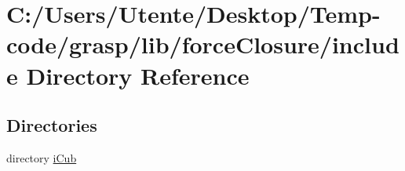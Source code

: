 \section{C\+:/\+Users/\+Utente/\+Desktop/\+Temp-\/code/grasp/lib/force\+Closure/include Directory Reference}
\label{dir_2755f29db1d4c659bd67ec84dbccb071}
\subsection*{Directories}
\begin{DoxyCompactItemize}
\item 
directory \hyperlink{dir_9c39d2143efe67bb56bc75adfc7ac268}{i\+Cub}
\end{DoxyCompactItemize}
